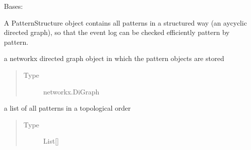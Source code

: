 \documentclass[letterpaper,10pt,english]{sphinxmanual}
\begin{document}
\begin{fulllineitems}
\label{\detokenize{event_log_analyzer:event_log_analyzer.pattern_library.pattern_structure.PatternStructure}}
\sphinxAtStartPar
Bases: 

\sphinxAtStartPar
A PatternStructure object contains all patterns in a structured way (an aycyclic directed graph), so that the event log can be checked efficiently pattern by pattern.

\begin{fulllineitems}
\label{\detokenize{event_log_analyzer:event_log_analyzer.pattern_library.pattern_structure.PatternStructure.dependency_graph}}
\sphinxAtStartPar
a networkx directed graph object in which the pattern objects are stored
\begin{quote}\begin{description}
\item[{Type}] \leavevmode
\sphinxAtStartPar
networkx.DiGraph

\end{description}\end{quote}

\end{fulllineitems}


\begin{fulllineitems}
\label{\detokenize{event_log_analyzer:event_log_analyzer.pattern_library.pattern_structure.PatternStructure.topological_order}}
\sphinxAtStartPar
a list of all patterns in a topological order
\begin{quote}\begin{description}
\item[{Type}] \leavevmode
\sphinxAtStartPar
List{[}{\hyperref[\detokenize{event_log_analyzer:event_log_analyzer.pattern_library.pattern.Pattern}]{}}{]}


\end{description}
\end{quote}
\end{fulllineitems}
\end{fulllineitems}
\end{document}
